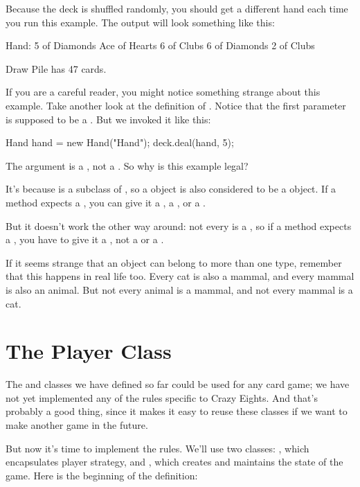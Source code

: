 Because the deck is shuffled randomly, you should get a different hand each time you run this example.
The output will look something like this:

\begin{stdout}
Hand:
5 of Diamonds
Ace of Hearts
6 of Clubs
6 of Diamonds
2 of Clubs

Draw Pile has 47 cards.
\end{stdout}

If you are a careful reader, you might notice something strange about this example.
Take another look at the definition of .
Notice that the first parameter is supposed to be a .
But we invoked it like this:

\begin{code}
Hand hand = new Hand("Hand");
deck.deal(hand, 5);
\end{code}

The argument is a , not a .
So why is this example legal?

It's because  is a subclass of , so a  object is also considered to be a  object.
If a method expects a , you can give it a , a , or a .

But it doesn't work the other way around: not every  is a , so if a method expects a , you have to give it a , not a  or a .

If it seems strange that an object can belong to more than one type, remember that this happens in real life too.
Every cat is also a mammal, and every mammal is also an animal.
But not every animal is a mammal, and not every mammal is a cat.



\section{The Player Class}

The  and  classes we have defined so far could be used for any card game; we have not yet implemented any of the rules specific to Crazy Eights.
And that's probably a good thing, since it makes it easy to reuse these classes if we want to make another game in the future.

But now it's time to implement the rules.
We'll use two classes: , which encapsulates player strategy, and , which creates and maintains the state of the game.
Here is the beginning of the  definition:

